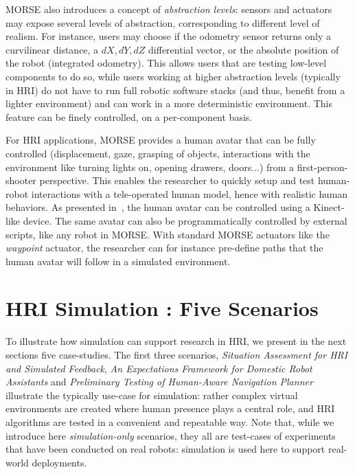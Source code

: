 \documentclass{llncs}
\begin{document}

MORSE also introduces a concept of \emph{abstraction levels}: sensors and actuators
may expose several levels of abstraction, corresponding to different level of
realism. For instance, users may choose if the odometry sensor returns only a
curvilinear distance, a $dX, dY, dZ$ differential vector, or the absolute
position of the robot (integrated odometry). This allows users that are testing
low-level components to do so, while users working at higher abstraction
levels (typically in HRI) do not have to run full robotic software stacks (and
thus, benefit from a lighter environment) and can work in a more deterministic
environment. This feature can be finely controlled, on a per-component basis.

For HRI applications, MORSE provides a human avatar that can be fully controlled
(displacement, gaze, grasping of objects, interactions with the environment like
turning lights on, opening drawers, doors...) from a first-person-shooter perspective.
This enables the researcher to quickly setup and test human-robot interactions
with a tele-operated human model, hence with realistic human behaviors. As
presented in~\cite{lemaignan2012morse}, the human avatar can be controlled using
a Kinect-like device. The same avatar can also be programmatically controlled
by external scripts, like any robot in MORSE. With standard MORSE actuators like
the \emph{waypoint} actuator, the researcher can for instance pre-define paths
that the human avatar will follow in a simulated environment.

\section{HRI Simulation : Five Scenarios}

To illustrate how simulation can support research in HRI, we present in the next
sections five case-studies.  The first three scenarios, \emph{Situation
Assessment for HRI and Simulated Feedback}, \emph{An Expectations Framework for
Domestic Robot Assistants} and \emph{Preliminary Testing of Human-Aware
Navigation Planner} illustrate the typically use-case for simulation: rather
complex virtual environments are created where human presence plays a
central role, and HRI algorithms are tested in a convenient and repeatable way.
Note that, while we introduce here \emph{simulation-only} scenarios, they all
are test-cases of experiments that have been conducted on real robots:
simulation is used here to support real-world deployments.
\end{document}
